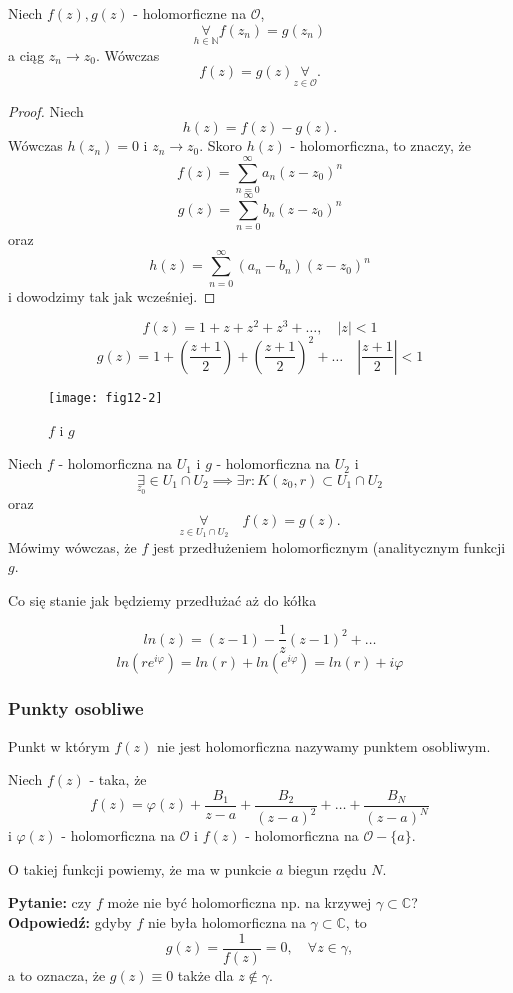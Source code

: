\documentclass[../main.tex]{subfiles}
\begin{document}
\begin{tw}
    Niech $f(z),g(z)$ - holomorficzne na $\mathcal{O}$,
    \[
        \underset{h \in \mathbb{N}}{\forall} f(z_n) = g(z_n)
    \]
    a ciąg $z_n\to z_0$. Wówczas
    \[
        f(z) = g(z) \underset{z\in \mathcal{O}}{\forall}
    .\]
\end{tw}
\begin{proof}
    Niech
    \[
        h(z) = f(z) - g(z)
    .\]
Wówczas $h(z_n) = 0$ i $z_n\to z_0$. Skoro $h(z)$ - holomorficzna, to znaczy, że
    \[
        f(z) = \sum_{n = 0}^{\infty} a_n (z-z_0)^n
    \]
    \[
        g(z) = \sum_{n = 0}^{\infty} b_n (z-z_0)^n
    \]
    oraz
    \[
        h(z) = \sum_{n = 0}^{\infty} (a_n - b_n) (z-z_0)^n
    \]
    i dowodzimy tak jak wcześniej.
\end{proof}
\begin{przyklad}
    \[
        f(z) = 1 + z + z^2 + z^3 + \dots,\quad |z| < 1
    \]
    \[
        g(z) = 1 + \left(\frac{z+1}{2}\right) + \left(\frac{z+1}{2}\right)^2 + \dots\quad \left| \frac{z+1}{2} \right| < 1
    \]
\begin{figure}[h]
    \center
    \texttt{[image: fig12-2]}
    \caption{$f$ i $g$}
\end{figure}
\end{przyklad}
\begin{definicja}
    Niech $f$ - holomorficzna na $U_1$ i $g$ - holomorficzna na $U_2$ i
    \[
        \underset{z_0}{\exists} \in U_1\cap U_2 \implies \exists r: K(z_0,r) \subset U_1\cap U_2
    \]
    oraz
    \[
        \underset{z\in U_1\cap U_2}{\forall}\quad f(z) = g(z)
    .\]
Mówimy wówczas, że $f$ jest przedłużeniem holomorficznym (analitycznym funkcji $g$.
\end{definicja}
\begin{przyklad}
    Co się stanie jak będziemy przedłużać aż do kółka

    \[
        ln(z) = (z - 1) - \frac{1}{z}(z-1)^2 + \dots
    \]
    \[
        ln(re^{i\varphi}) = ln(r) + ln\left(e^{i\varphi}\right) = ln(r) + i\varphi
    \]
\end{przyklad}
\subsubsection{Punkty osobliwe}
\begin{definicja}
    Punkt w którym $f(z)$ nie jest holomorficzna nazywamy punktem osobliwym.
\end{definicja}
\begin{definicja}
    Niech $f(z)$ - taka, że
    \[
        f(z) = \varphi(z) + \frac{B_1}{z - a} + \frac{B_2}{(z - a)^2} + \dots + \frac{B_N}{(z-a)^N}
    \]
    i $\varphi(z)$ - holomorficzna na $\mathcal{O}$ i $f(z)$ - holomorficzna na $\mathcal{O} - \{a\}$.

    O takiej funkcji powiemy, że ma w punkcie $a$ biegun rzędu $N$.
\end{definicja}
\textbf{Pytanie: } czy $f$ może nie być holomorficzna np. na krzywej $\gamma \subset \mathbb{C}$?\\
\textbf{Odpowiedź: } gdyby $f$ nie była holomorficzna na $\gamma \subset \mathbb{C}$, to
\[
    g(z) = \frac{1}{f(z)} = 0,\quad \forall z\in \gamma
,\]
a to oznacza, że $g(z) \equiv 0$ także dla $z\not\in \gamma$.
\end{document}
